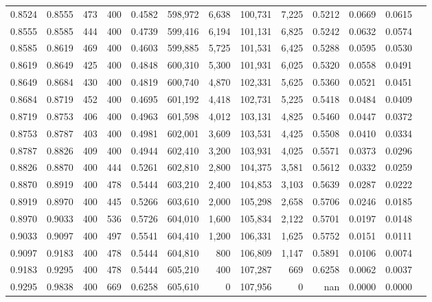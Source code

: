 \begin{tabular}{rrrrrrrrrrrrr}
0.8524 & 0.8555 &    473 & 400 &                                     0.4582 & 598,972 &   6,638 & 100,731 &   7,225 & 0.5212 & 0.0669 & 0.0615 \\
0.8555 & 0.8585 &    444 & 400 &                                     0.4739 & 599,416 &   6,194 & 101,131 &   6,825 & 0.5242 & 0.0632 & 0.0574 \\
0.8585 & 0.8619 &    469 & 400 &                                     0.4603 & 599,885 &   5,725 & 101,531 &   6,425 & 0.5288 & 0.0595 & 0.0530 \\
0.8619 & 0.8649 &    425 & 400 &                                     0.4848 & 600,310 &   5,300 & 101,931 &   6,025 & 0.5320 & 0.0558 & 0.0491 \\
0.8649 & 0.8684 &    430 & 400 &                                     0.4819 & 600,740 &   4,870 & 102,331 &   5,625 & 0.5360 & 0.0521 & 0.0451 \\
0.8684 & 0.8719 &    452 & 400 &                                     0.4695 & 601,192 &   4,418 & 102,731 &   5,225 & 0.5418 & 0.0484 & 0.0409 \\
0.8719 & 0.8753 &    406 & 400 &                                     0.4963 & 601,598 &   4,012 & 103,131 &   4,825 & 0.5460 & 0.0447 & 0.0372 \\
0.8753 & 0.8787 &    403 & 400 &                                     0.4981 & 602,001 &   3,609 & 103,531 &   4,425 & 0.5508 & 0.0410 & 0.0334 \\
0.8787 & 0.8826 &    409 & 400 &                                     0.4944 & 602,410 &   3,200 & 103,931 &   4,025 & 0.5571 & 0.0373 & 0.0296 \\
0.8826 & 0.8870 &    400 & 444 &                                     0.5261 & 602,810 &   2,800 & 104,375 &   3,581 & 0.5612 & 0.0332 & 0.0259 \\
0.8870 & 0.8919 &    400 & 478 &                                     0.5444 & 603,210 &   2,400 & 104,853 &   3,103 & 0.5639 & 0.0287 & 0.0222 \\
0.8919 & 0.8970 &    400 & 445 &                                     0.5266 & 603,610 &   2,000 & 105,298 &   2,658 & 0.5706 & 0.0246 & 0.0185 \\
0.8970 & 0.9033 &    400 & 536 &                                     0.5726 & 604,010 &   1,600 & 105,834 &   2,122 & 0.5701 & 0.0197 & 0.0148 \\
0.9033 & 0.9097 &    400 & 497 &                                     0.5541 & 604,410 &   1,200 & 106,331 &   1,625 & 0.5752 & 0.0151 & 0.0111 \\
0.9097 & 0.9183 &    400 & 478 &                                     0.5444 & 604,810 &     800 & 106,809 &   1,147 & 0.5891 & 0.0106 & 0.0074 \\
0.9183 & 0.9295 &    400 & 478 &                                     0.5444 & 605,210 &     400 & 107,287 &     669 & 0.6258 & 0.0062 & 0.0037 \\
0.9295 & 0.9838 &    400 & 669 &                                     0.6258 & 605,610 &       0 & 107,956 &       0 &    nan & 0.0000 & 0.0000 \\
\bottomrule
\end{tabular}
